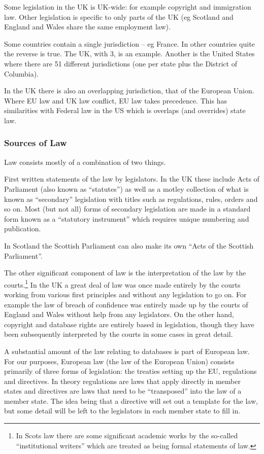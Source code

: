Some legislation in the UK is UK-wide: for example copyright and
immigration law. Other legislation is specific to only parts of the UK
(eg Scotland and England and Wales share the same employment law).

Some countries contain a single jurisdiction -- eg France. In other
countries quite the reverse is true. The UK, with 3, is an example.
Another is the United States where there are 51 different jurisdictions
(one per state plus the District of Columbia).

In the UK there is also an overlapping jurisdiction, that of the
European Union. Where EU law and UK law conflict, EU law takes
precedence. This has similarities with Federal law in the US which is
overlaps (and overrides) state law.

\subsubsection{Sources of Law}\label{sources-of-law}

Law consists mostly of a combination of two things.

First written statements of the law by legislators. In the UK these
include Acts of Parliament (also known as ``statutes'') as well as a
motley collection of what is known as ``secondary'' legislation with
titles such as regulations, rules, orders and so on. Most (but not all)
forms of secondary legislation are made in a standard form known as a
``statutory instrument'' which requires unique numbering and
publication.

In Scotland the Scottish Parliament can also make its own ``Acts of the
Scottish Parliament''.

The other significant component of law is the interpretation of the law
by the courts.\footnote{In Scots law there are some significant academic
  works by the so-called ``institutional writers'' which are treated as
  being formal statements of law.} In the UK a great deal of law was
once made entirely by the courts working from various first principles
and without any legislation to go on. For example the law of breach of
confidence was entirely made up by the courts of England and Wales
without help from any legislators. On the other hand, copyright and
database rights are entirely based in legislation, though they have been
subsequently interpreted by the courts in some cases in great detail.

A substantial amount of the law relating to databases is part of
European law. For our purposes, European law (the law of the European
Union) consists primarily of three forms of legislation: the treaties
setting up the EU, regulations and directives. In theory regulations are
laws that apply directly in member states and directives are laws that
need to be ``transposed'' into the law of a member state. The idea being
that a directive will set out a template for the law, but some detail
will be left to the legislators in each member state to fill in.

